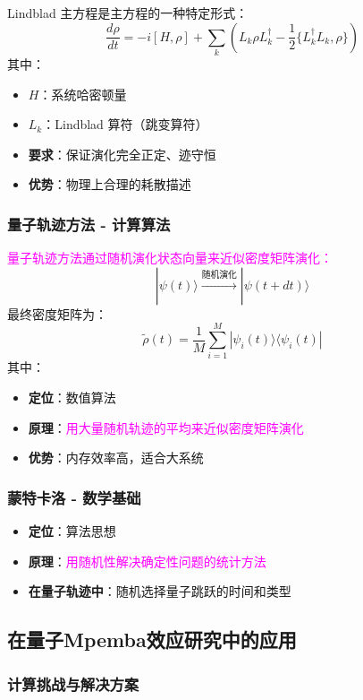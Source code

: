 \documentclass[11pt,a4paper]{article}
\begin{document}
Lindblad 主方程是主方程的一种特定形式：
\[
\frac{d\rho}{dt} = -i[H,\rho] + \sum_k \left(L_k\rho L_k^\dagger - \frac{1}{2}\{L_k^\dagger L_k, \rho\}\right)
\]
其中：
\begin{itemize}
    \item $H$：系统哈密顿量
    \item $L_k$：Lindblad 算符（跳变算符）
    \item \textbf{要求}：保证演化完全正定、迹守恒
    \item \textbf{优势}：物理上合理的耗散描述
\end{itemize}

\subsubsection{量子轨迹方法 - 计算算法}

\textcolor{magenta}{量子轨迹方法通过随机演化状态向量来近似密度矩阵演化：}
\[
|\psi(t)\rangle \xrightarrow{\text{随机演化}} |\psi(t+dt)\rangle
\]
最终密度矩阵为：
\[
\tilde{\rho}(t) = \frac{1}{M}\sum_{i=1}^{M} |\psi_i(t)\rangle\langle\psi_i(t)|
\]
其中：
\begin{itemize}
    \item \textbf{定位}：数值算法
    \item \textbf{原理}：\textcolor{magenta}{用大量随机轨迹的平均来近似密度矩阵演化}
    \item \textbf{优势}：内存效率高，适合大系统
\end{itemize}

\subsubsection{蒙特卡洛 - 数学基础}

\begin{itemize}
    \item \textbf{定位}：算法思想
    \item \textbf{原理}：\textcolor{magenta}{用随机性解决确定性问题的统计方法}
    \item \textbf{在量子轨迹中}：随机选择量子跳跃的时间和类型
\end{itemize}

\subsection{在量子Mpemba效应研究中的应用}

\subsubsection{计算挑战与解决方案}
\end{document}
